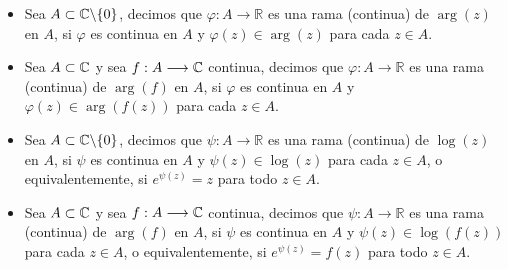 \begin{defi}
    \begin{itemize}
        \item Sea $A \subset \mathbb{C} \backslash \{0\}$, decimos que $\varphi : A \longrightarrow \mathbb{R}$ es una rama (continua) de $\arg(z)$ en $A$, si $\varphi$ es continua en $A$ y $\varphi(z) \in \arg(z)$ para cada $z \in A$.
        \item Sea $A \subset \mathbb{C}$ y sea $f: A \longrightarrow \mathbb{C}$ continua, decimos que $\varphi : A \longrightarrow \mathbb{R}$ es una rama (continua) de $\arg(f)$ en $A$, si $\varphi$ es continua en $A$ y $\varphi(z) \in \arg(f(z))$ para cada $z \in A$.
        \item Sea $A \subset \mathbb{C} \backslash \{0\}$, decimos que $\psi : A \longrightarrow \mathbb{R}$ es una rama (continua) de $\log(z)$ en $A$, si $\psi$ es continua en $A$ y $\psi(z) \in \log(z)$ para cada $z \in A$, o  equivalentemente, si $e^{\psi(z)} = z$ para todo $z \in A$.
        \item Sea $A \subset \mathbb{C}$ y sea $f: A \longrightarrow \mathbb{C}$ continua, decimos que $\psi : A \longrightarrow \mathbb{R}$ es una rama (continua) de $\arg(f)$ en $A$, si $\psi$ es continua en $A$ y $\psi(z) \in \log(f(z))$ para cada $z \in A$, o  equivalentemente, si $e^{\psi(z)} = f(z)$ para todo $z \in A$.
    \end{itemize}
\end{defi}


